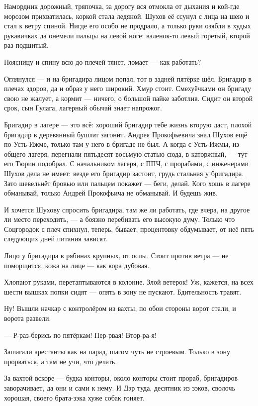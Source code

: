 Намордник дорожный, тряпочка, за дорогу вся отмокла от дыхания и кой-где морозом
прихватилась, коркой стала ледяной. Шухов её ссунул с лица на шею и стал к ветру спиной. Нигде
его особо не продрало, а только руки озябли в худых рукавичках да онемели пальцы на левой
ноге: валенок-то левый горетый, второй раз подшитый.

Поясницу и спину всю до плечей тянет, ломает --- как работать?

Оглянулся --- и на бригадира лицом попал, тот в задней пятёрке шёл. Бригадир в плечах здоров,
да и образ у него широкий. Хмур стоит. Смехуёчками он бригаду свою не жалует, а кормит ---
ничего, о большой пайке заботлив. Сидит он второй срок, сын Гулага, лагерный обычай знает
напрожог.

Бригадир в лагере --- это всё: хороший бригадир тебе жизнь вторую даст, плохой бригадир в
деревянный бушлат загонит. Андрея Прокофьевича знал Шухов ещё по Усть-Ижме, только там у
него в бригаде не был. А когда с Усть-Ижмы, из общего лагеря, перегнали пятьдесят восьмую
статью сюда, в каторжный, --- тут его Тюрин подобрал. С начальником лагеря, с ППЧ, с прорабами, с
инженерами Шухов дела не имеет: везде его бригадир застоит, грудь стальная у бригадира. Зато
шевельнёт бровью или пальцем покажет --- беги, делай. Кого хошь в лагере обманывай, только
Андрей Прокофьича не обманывай. И будешь жив.

И хочется Шухову спросить бригадира, там же ли работать, где вчера, на другое ли место
переходить, --- а боязно перебивать его высокую думу. Только что Соцгородок с плеч спихнул,
теперь, бывает, процентовку обдумывает, от неё пять следующих дней питания зависят.

Лицо у бригадира в рябинах крупных, от оспы. Стоит против ветра --- не поморщится, кожа на лице
--- как кора дубовая.

Хлопают руками, перетаптываются в колонне. Злой ветерок! Уж, кажется, на всех шести вышках
попки сидят --- опять в зону не пускают. Бдительность травят.

Ну! Вышли начкар с контролёром из вахты, по обои стороны ворот стали, и ворота развели.

--- Р-раз-берись по пятёркам! Пер-рвая! Втор-ра-я!

Зашагали арестанты как на парад, шагом чуть не строевым. Только в зону прорваться, а там не
учи, что делать.

За вахтой вскоре --- будка конторы, около конторы стоит прораб, бригадиров заворачивает, да
они и сами к нему. И Дэр туда, десятник из зэков, сволочь хорошая, своего брата-зэка хуже собак
гоняет.

